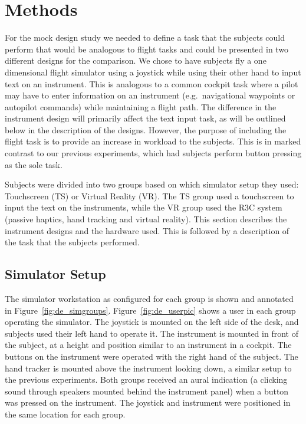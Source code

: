 \section{Methods}

For the mock design study we needed to define a task that the subjects could perform that would be analogous to flight tasks and could be presented in two different designs for the comparison.
We chose to have subjects fly a one dimensional flight simulator using a joystick while using their other hand to input text on an instrument.
This is analogous to a common cockpit task where a pilot may have to enter information on an instrument (e.g.\ navigational waypoints or autopilot commands) while maintaining a flight path.
The difference in the instrument design will primarily affect the text input task, as will be outlined below in the description of the designs.
However, the purpose of including the flight task is to provide an increase in workload to the subjects.
This is in marked contrast to our previous experiments, which had subjects perform button pressing as the sole task.

Subjects were divided into two groups based on which simulator setup they used: Touchscreen (TS) or Virtual Reality (VR).
The TS group used a touchscreen to input the text on the instruments, while the VR group used the R3C system (passive haptics, hand tracking and virtual reality).
This section describes the instrument designs and the hardware used.
This is followed by a description of the task that the subjects performed.

\subsection{Simulator Setup}

The simulator workstation as configured for each group is shown and annotated in Figure~\ref{fig:de_simgroups}.
Figure~\ref{fig:de_userpic} shows a user in each group operating the simulator.
The joystick is mounted on the left side of the desk, and subjects used their left hand to operate it.
The instrument is mounted in front of the subject, at a height and position similar to an instrument in a cockpit.
The buttons on the instrument were operated with the right hand of the subject.
The hand tracker is mounted above the instrument looking down, a similar setup to the previous experiments.
Both groups received an aural indication (a clicking sound through speakers mounted behind the instrument panel) when a button was pressed on the instrument.
The joystick and instrument were positioned in the same location for each group.

